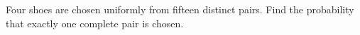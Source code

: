 Four shoes are chosen uniformly from fifteen distinct pairs. Find the probability that exactly one complete pair is chosen.
